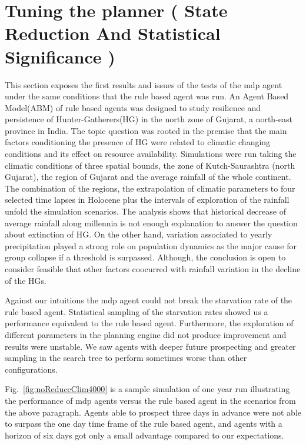 \documentclass[11pt,oneside,a4paper,openright]{report}
\begin{document}
\section{Tuning the planner ( State Reduction And Statistical Significance )}
\label{sec:expStateReduction}

This section exposes the first results and issues of the tests of the mdp agent under the same conditions 
that the rule based agent was run\cite{JARM2014}. An Agent Based Model(ABM) of rule based agents was designed to study 
resilience and persistence of Hunter-Gatherers(HG) in the north zone of Gujarat, a north-east province in India. 
The topic question was rooted in the premise that the main factors conditioning the presence of HG were 
related to climatic changing conditions and its effect on resource availability. 
Simulations were run taking the climatic conditions of three spatial bounds, the zone of Kutch-Saurashtra 
(north Gujarat), the region of Gujarat and the average rainfall of the whole continent. The combination of
the regions, the extrapolation of climatic parameters to four selected time lapses in Holocene plus the 
intervals of exploration of the rainfall unfold the simulation scenarios.
The analysis shows that historical decrease of average rainfall along millennia is not enough explanation 
to answer the question about extinction of HG. On the other hand, variation associated to yearly precipitation
played a strong role on population dynamics as the major cause for group collapse if a threshold is 
surpassed. Although, the conclusion is open to consider feasible that other factors coocurred with rainfall 
variation in the decline of the HGs.

Against our intuitions the mdp agent could not break the starvation rate of the rule based agent. Statistical 
sampling of the starvation rates showed us a performance equivalent to the rule based agent. Furthermore, 
the exploration of different parameters in the planning engine did not produce improvement and results were unstable. 
We saw agents with deeper future prospecting and greater sampling in the search tree to perform sometimes 
worse than other configurations.


Fig.~\ref{fig:noReduccClim4000} is a sample simulation of one year run illustrating the performance of mdp 
agents versus the rule based agent in the scenarios from the above paragraph. Agents able to prospect three 
days in advance were not able to surpass the one day time frame of the rule based agent, and agents with a 
horizon of six days got only a small advantage compared to our expectations.
\end{document}
